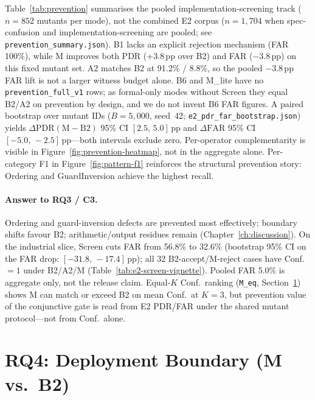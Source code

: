 Table~\ref{tab:prevention} summarises the pooled implementation-screening
track ($n{=}852$ mutants per mode), not the combined E2 corpus ($n{=}1{,}704$
when spec-confusion and implementation-screening are pooled; see
\texttt{prevention\_summary.json}).
B1 lacks an explicit rejection mechanism (FAR 100\%), while M improves both
PDR (+3.8\,pp over B2) and FAR ($-$3.8\,pp) on this fixed mutant set.
A2 matches B2 at 91.2\% / 8.8\%, so the pooled ${-}3.8$\,pp FAR lift is not a
larger witness budget alone.
B6 and M\_lite have no \texttt{prevention\_full\_v1} rows; as formal-only modes
without Screen they equal B2/A2 on prevention by design, and we do not invent
B6 FAR figures.
A paired bootstrap over mutant IDs ($B{=}5{,}000$, seed~42;
\texttt{e2\_pdr\_far\_bootstrap.json}) yields
$\Delta\mathrm{PDR}(\mathrm{M}{-}\mathrm{B2})$ 95\% CI
$[2.5,\,5.0]$\,pp and $\Delta\mathrm{FAR}$ 95\% CI
$[-5.0,\,{-}2.5]$\,pp---both intervals exclude zero.
Per-operator complementarity is visible in
Figure~\ref{fig:prevention-heatmap}, not in the aggregate alone.
Per-category F1 in Figure~\ref{fig:pattern-f1} reinforces the structural
prevention story: Ordering and GuardInversion achieve the highest recall.

\paragraph{Answer to RQ3 / C3.}
Ordering and guard-inversion defects are prevented most effectively;
boundary shifts favour B2; arithmetic/output residues remain
(Chapter~\ref{ch:discussion}).
On the industrial slice, Screen cuts FAR from 56.8\% to 32.6\% (bootstrap 95\%
CI on the FAR drop: $[-31.8,\,-17.4]$\,pp); all 32 B2-accept/M-reject cases
have Conf.${=}1$ under B2/A2/M (Table~\ref{tab:e2-screen-vignette}).
Pooled FAR 5.0\% is aggregate only, not the release claim.
Equal-$K$ Conf.\ ranking (\texttt{M\_eq}, Section~\ref{sec:results:rq4})
shows M can match or exceed B2 on mean Conf.\ at $K{=}3$, but prevention
value of the conjunctive gate is read from E2 PDR/FAR under the shared mutant
protocol---not from Conf.\ alone.

\section{RQ4: Deployment Boundary (M vs.\ B2)}
\label{sec:results:rq4}

